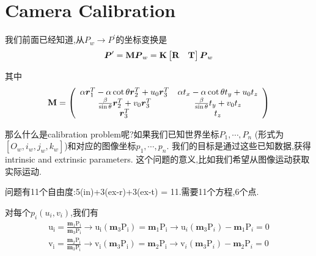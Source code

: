 \section{Camera Calibration}

我们前面已经知道,从$P_w \to P^\prime$的坐标变换是
\begin{equation}
	\boldsymbol P^\prime = \bold{M} \boldsymbol P_w = \bold{K}
	\begin{bmatrix}
		\bold{R} & \bold{T}
	\end{bmatrix} \boldsymbol P_w
\end{equation}

其中
\begin{equation}
	\bold{M}=\left(\begin{array}{cc}
		\alpha \boldsymbol{r}_{1}^{T}-\alpha \cot \theta \boldsymbol{r}_{2}^{T}+u_{0} \boldsymbol{r}_{3}^{T} & \alpha t_{x}-\alpha \cot \theta t_{y}+u_{0} t_{z} \\
		\frac{\beta}{\sin \theta} \boldsymbol{r}_{2}^{T}+v_{0} \boldsymbol{r}_{3}^{T} & \frac{\beta}{\sin \theta} t_{y}+v_{0} t_{z} \\
		\boldsymbol{r}_{3}^{T} & t_{z}
	\end{array}\right)
\end{equation}

那么什么是calibration problem呢?如果我们已知世界坐标$P_1, \cdots, P_n$
(形式为$[O_w, i_w, j_w, k_w]$)和对应的图像坐标$p_1,\cdots, p_n$.
我们的目标是通过这些已知数据,获得intrinsic and extrinsic parameters.
这个问题的意义,比如我们希望从图像运动获取实际运动.

问题有11个自由度:5(in)+3(ex-r)+3(ex-t) = 11.需要11个方程,6个点.

对每个$p_i(u_i, v_i)$,我们有
\begin{equation}
	\begin{array}{l}
		\mathrm{u}_{\mathrm{i}}=\frac{\mathbf{m}_{1} \mathrm{P}_{\mathrm{i}}}{\mathbf{m}_{3} \mathrm{P}_{\mathrm{i}}} \rightarrow \mathrm{u}_{\mathrm{i}}\left(\mathbf{m}_{3} \mathrm{P}_{\mathrm{i}}\right)=\mathbf{m}_{1} \mathrm{P}_{\mathrm{i}} \rightarrow \mathrm{u}_{i}\left(\mathbf{m}_{3} \mathrm{P}_{i}\right)-\mathbf{m}_{1} \mathrm{P}_{i}=0 \\
		\mathrm{v}_{\mathrm{i}}=\frac{\mathbf{m}_{2} \mathrm{P}_{\mathrm{i}}}{\mathbf{m}_{3} \mathrm{P}_{\mathrm{i}}} \rightarrow \mathrm{v}_{\mathrm{i}}\left(\mathbf{m}_{3} \mathrm{P}_{\mathrm{i}}\right)=\mathbf{m}_{2} \mathrm{P}_{\mathrm{i}} \rightarrow \mathrm{v}_{i}\left(\mathbf{m}_{3} \mathrm{P}_{i}\right)-\mathbf{m}_{2} \mathrm{P}_{i}=0
	\end{array}
\end{equation}


